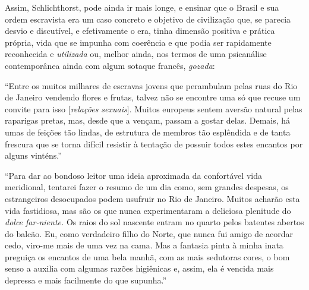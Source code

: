 Assim, Schlichthorst, pode ainda ir mais longe, e ensinar que o Brasil e
sua ordem escravista era um caso concreto e objetivo de civilização que,
se parecia desvio e discutível, e efetivamente o era, tinha dimensão
positiva e prática própria, vida que se impunha com coerência e que
podia ser rapidamente reconhecida e \emph{utilizada} ou, melhor ainda,
nos termos de uma psicanálise contemporânea ainda com algum sotaque
francês, \emph{gozada}:

``Entre os muitos milhares de escravas jovens que perambulam pelas ruas
do Rio de Janeiro vendendo flores e frutas, talvez não se encontre uma
só que recuse um convite para isso {[}\emph{relações sexuais}{]}. Muitos
europeus sentem aversão natural pelas raparigas pretas, mas, desde que a
vençam, passam a gostar delas. Demais, há umas de feições tão lindas, de
estrutura de membros tão esplêndida e de tanta frescura que se torna
difícil resistir à tentação de possuir todos estes encantos por alguns
vinténs.''

``Para dar ao bondoso leitor uma ideia aproximada da confortável vida
meridional, tentarei fazer o resumo de um dia como, sem grandes
despesas, os estrangeiros desocupados podem usufruir no Rio de Janeiro.
Muitos acharão esta vida fastidiosa, mas são os que nunca experimentaram
a deliciosa plenitude do \emph{dolce far-niente.} Os raios do sol
nascente entram no quarto pelos batentes abertos do balcão. Eu, como
verdadeiro filho do Norte, que nunca fui amigo de acordar cedo, viro-me
mais de uma vez na cama. Mas a fantasia pinta à minha inata preguiça os
encantos de uma bela manhã, com as mais sedutoras cores, o bom senso a
auxilia com algumas razões higiênicas e, assim, ela é vencida mais
depressa e mais facilmente do que supunha.''

